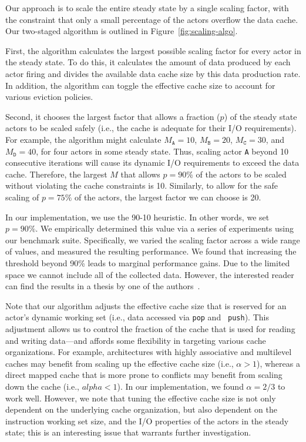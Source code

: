 Our approach is to scale the entire steady state by a single
scaling factor, with the constraint that only a small percentage
of the actors overflow the data cache. Our two-staged algorithm is
outlined in Figure~\ref{fig:scaling-algo}.

First, the algorithm calculates the largest possible scaling factor
for every actor in the steady state. To do this, it calculates the
amount of data produced by each actor firing and divides the available
data cache size by this data production rate. In addition, the
algorithm can toggle the effective cache size to account for various
eviction policies.

Second, it chooses the largest
factor that allows a fraction ($p$) of the steady state actors to be
scaled safely (i.e., the cache is adequate for their I/O
requirements).  For example, the algorithm might calculate
$M_\texttt{A} = 10$,
$M_\texttt{B} = 20$, 
$M_\texttt{C} = 30$, and 
$M_\texttt{D} = 40$, for four actors in some steady state. Thus,
scaling actor \texttt{A} beyond 10 consecutive iterations will cause
its dynamic I/O requirements to exceed the data cache. Therefore, the
largest $M$ that allows $p=90\%$ of the actors to be
scaled without violating the cache constraints is 10.
Similarly, to allow for the safe scaling of $p=75\%$ of the actors, the
largest factor we can choose is 20.

In our implementation, we use the 90-10 heuristic. In other words, we
set $p=90\%$. We empirically determined this value via a series of
experiments using our benchmark suite. Specifically, we varied the
scaling factor across a wide range of values,
and measured the resulting performance. We found that
increasing the threshold beyond 90\% leads to marginal
performance gains. Due to the limited space we cannot include all of
the collected data. However, the interested reader can find
the results in a thesis by one of the authors~\cite{janis-thesis}.


Note that our algorithm adjusts the effective cache size that is
reserved for an actor's 
dynamic working set (i.e., data accessed via {\tt pop} and {\tt
push}). This adjustment allows us to control the fraction of the cache
that is used for reading and writing data---and affords some
flexibility in targeting various cache organizations.  For example,
architectures with highly associative and multilevel caches may benefit
from scaling up the effective cache size (i.e., $\alpha > 1$), whereas
a direct mapped cache that is more prone to conflicts may benefit from
scaling down the cache (i.e., $alpha < 1$). In our implementation, we
found $\alpha=2/3$ to work well. However, we note that tuning the
effective cache size is not only dependent on the underlying cache
organization, but also dependent on the instruction  working
set size, and the  I/O properties of the actors in the steady
state; this is an interesting issue that warrants further
investigation.
